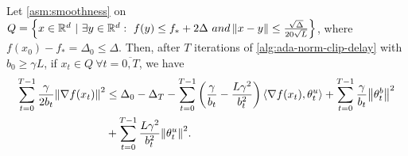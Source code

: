 \documentclass{article}
\begin{document}
\begin{lemma}
\label{lem:descent-nonconvex}
Let \cref{asm:smoothness}  on $Q = \Big\{x \in \R^d \ | \ \exists y \in \R^d: \ f(y) \leq f_* + 2\Delta \ and \norm{x - y} \leq \frac{\sqrt{\Delta}}{20\sqrt{L}}\Big\}$, where $f(x_0) - f_* = \Delta_0 \leq \Delta$. Then, after $T$ iterations of \cref{alg:ada-norm-clip-delay} with $b_0 \geq \gamma L$, if $x_t \in Q \ \forall t = \overline{0, T}$, we have
    \begin{align*}
        \sum\limits_{t=0}^{T-1}\frac{\gamma}{2b_t}{\left\lVert\nabla f(x_t)\right\rVert}^2 &\leq \Delta_0 - \Delta_T - \sum\limits_{t=0}^{T-1}\left(\frac{\gamma}{b_t} - \frac{L\gamma^2}{b_t^2}\right)\left \langle \nabla f(x_t), \theta_t^u \right \rangle + \sum\limits_{t=0}^{T-1} \frac{\gamma}{b_t}{\left\lVert\theta_t^b\right\rVert}^2\\&+ \sum\limits_{t=0}^{T-1}\frac{L\gamma^2}{b_t^2}{\left\lVert\theta_t^u\right\rVert}^2.
    \end{align*}
\end{lemma}
\end{document}
